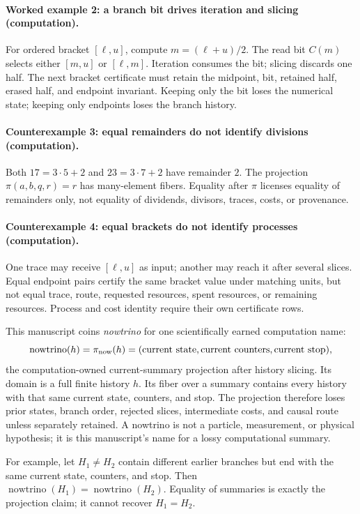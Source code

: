 \paragraph{Worked example 2: a branch bit drives iteration and slicing (computation).}
For ordered bracket \([\ell,u]\), compute \(m=(\ell+u)/2\).  The read bit \(C(m)\) selects either \([m,u]\) or
\([\ell,m]\).  Iteration consumes the bit; slicing discards one half.  The next bracket certificate must retain the
midpoint, bit, retained half, erased half, and endpoint invariant.  Keeping only the bit loses the numerical state;
keeping only endpoints loses the branch history.

\paragraph{Counterexample 3: equal remainders do not identify divisions (computation).}
Both \(17=3\cdot5+2\) and \(23=3\cdot7+2\) have remainder \(2\).  The projection
\(\pi(a,b,q,r)=r\) has many-element fibers.  Equality after \(\pi\) licenses equality of remainders only, not equality
of dividends, divisors, traces, costs, or provenance.

\paragraph{Counterexample 4: equal brackets do not identify processes (computation).}
One trace may receive \([\ell,u]\) as input; another may reach it after several slices.  Equal endpoint pairs certify
the same bracket value under matching units, but not equal trace, route, requested resources, spent resources, or
remaining resources.  Process and cost identity require their own certificate rows.

This manuscript coins \emph{nowtrino} for one scientifically earned computation name:
\[
 \operatorname{nowtrino}(h)=\pi_{\rm now}(h)
   =(\text{current state},\text{current counters},\text{current stop}),
\]
the computation-owned current-summary projection after history slicing.  Its domain is a full finite history \(h\).
Its fiber over a summary contains every history with that same current state, counters, and stop.  The projection
therefore loses prior states, branch order, rejected slices, intermediate costs, and causal route unless separately
retained.  A nowtrino is not a particle, measurement, or physical hypothesis; it is this manuscript's name for a
lossy computational summary.

For example, let \(H_1\ne H_2\) contain different earlier branches but end with the same current state, counters, and
stop.  Then \(\operatorname{nowtrino}(H_1)=\operatorname{nowtrino}(H_2)\).  Equality of summaries is exactly the
projection claim; it cannot recover \(H_1=H_2\).

